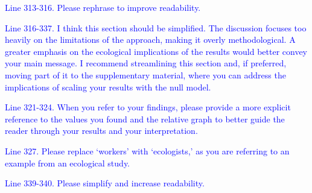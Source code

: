\documentclass[
]{article}
\begin{document}
\textcolor{blue}{Line 313-316. Please rephrase to improve readability.}

\textcolor{blue}{Line 316-337. I think this section should be simplified.
The discussion focuses too heavily on the limitations of the approach, making it overly methodological.
A greater emphasis on the ecological implications of the results would better convey your main message.
I recommend streamlining this section and, if preferred, moving part of it to the supplementary material, where you can address the implications of scaling your results with the null model.}

\textcolor{blue}{Line 321-324. When you refer to your findings, please provide a more explicit reference to the values you found and the relative graph to better guide the reader through your results and your interpretation.}

\textcolor{blue}{Line 327. Please replace `workers' with `ecologists,' as you are referring to an example from an ecological study.}

\textcolor{blue}{Line 339-340. Please simplify and increase readability.}
\end{document}
